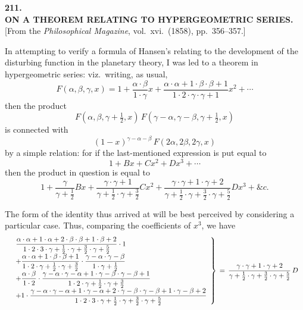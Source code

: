 \documentclass[11pt]{article}
\begin{document}
\begin{center}
\textbf{211.}\\[0.5em]
{\large\bfseries ON A THEOREM RELATING TO HYPERGEOMETRIC SERIES.}\\[0.5em]
[From the \textit{Philosophical Magazine}, vol.\ xvi.\ (1858), pp.\ 356--357.]
\end{center}

\medskip

\noindent In attempting to verify a formula of Hansen's relating to the development of the disturbing function in the planetary theory, I was led to a theorem in hypergeometric series: viz.\ writing, as usual,
\[
F(\alpha,\beta,\gamma,x) = 1 + \frac{\alpha\cdot\beta}{1\cdot\gamma}x + \frac{\alpha\cdot\alpha+1\cdot\beta\cdot\beta+1}{1\cdot 2\cdot\gamma\cdot\gamma+1}x^2 + \cdots
\]
then the product
\[
F(\alpha,\beta,\gamma+\tfrac{1}{2},x)\,F(\gamma-\alpha,\gamma-\beta,\gamma+\tfrac{1}{2},x)
\]
is connected with
\[
(1-x)^{\gamma-\alpha-\beta}\,F(2\alpha,2\beta,2\gamma,x)
\]
by a simple relation: for if the last-mentioned expression is put equal to
\[
1 + Bx + Cx^2 + Dx^3 + \cdots
\]
then the product in question is equal to
\[
1 + \frac{\gamma}{\gamma + \tfrac{1}{2}}Bx + \frac{\gamma\cdot\gamma+1}{\gamma+\tfrac{1}{2}\cdot\gamma+\tfrac{3}{2}}Cx^2 + \frac{\gamma\cdot\gamma+1\cdot\gamma+2}{\gamma+\tfrac{1}{2}\cdot\gamma+\tfrac{3}{2}\cdot\gamma+\tfrac{5}{2}}Dx^3 + \&c.
\]

The form of the identity thus arrived at will be best perceived by considering a particular case. Thus, comparing the coefficients of $x^3$, we have
\[ \resizebox{\textwidth}{!}{$\displaystyle
\left.\begin{array}{l}
\dfrac{\alpha\cdot\alpha+1\cdot\alpha+2\cdot\beta\cdot\beta+1\cdot\beta+2}{1\cdot 2\cdot 3\cdot\gamma+\tfrac{1}{2}\cdot\gamma+\tfrac{3}{2}\cdot\gamma+\tfrac{5}{2}}\cdot 1\\[1ex]
+\dfrac{\alpha\cdot\alpha+1\cdot\beta\cdot\beta+1}{1\cdot 2\cdot\gamma+\tfrac{1}{2}\cdot\gamma+\tfrac{3}{2}}\cdot\dfrac{\gamma-\alpha\cdot\gamma-\beta}{1\cdot\gamma+\tfrac{1}{2}}\\[1ex]
+\dfrac{\alpha\cdot\beta}{1\cdot 2}\cdot\dfrac{\gamma-\alpha\cdot\gamma-\alpha+1\cdot\gamma-\beta\cdot\gamma-\beta+1}{1\cdot 2\cdot\gamma+\tfrac{1}{2}\cdot\gamma+\tfrac{3}{2}}\\[1ex]
+1\cdot\dfrac{\gamma-\alpha\cdot\gamma-\alpha+1\cdot\gamma-\alpha+2\cdot\gamma-\beta\cdot\gamma-\beta+1\cdot\gamma-\beta+2}{1\cdot 2\cdot 3\cdot\gamma+\tfrac{1}{2}\cdot\gamma+\tfrac{3}{2}\cdot\gamma+\tfrac{5}{2}}
\end{array}\right\}\, =\, \dfrac{\gamma\cdot\gamma+1\cdot\gamma+2}{\gamma+\tfrac{1}{2}\cdot\gamma+\tfrac{3}{2}\cdot\gamma+\tfrac{5}{2}}\,D
$} \]
\end{document}
